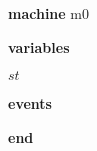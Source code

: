 \begin{block}
  \item   \textbf{machine} m0
  \item   \textbf{variables}
  \begin{block}
    \item   $st$
  \end{block}
  \item   
  \item   \textbf{events}
  \begin{block}
    \item   
    \item   
  \end{block}
  \item   \textbf{end} \\
\end{block}
